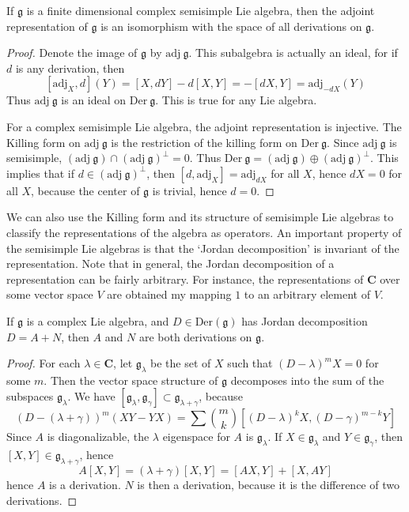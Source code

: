 \begin{theorem}
    If $\mathfrak{g}$ is a finite dimensional complex semisimple Lie algebra, then the adjoint representation of $\mathfrak{g}$ is an isomorphism with the space of all derivations on $\mathfrak{g}$.
\end{theorem}
\begin{proof}
    Denote the image of $\mathfrak{g}$ by $\text{adj}\ \mathfrak{g}$. This subalgebra is actually an ideal, for if $d$ is any derivation, then
    \[ [\text{adj}_X, d](Y) = [X,dY] - d[X,Y] = -[dX,Y] = \text{adj}_{-dX}(Y) \]
    Thus $\text{adj}\ \mathfrak{g}$ is an ideal on $\text{Der}\ \mathfrak{g}$. This is true for any Lie algebra.

    For a complex semisimple Lie algebra, the adjoint representation is injective. The Killing form on $\text{adj}\ \mathfrak{g}$ is the restriction of the killing form on $\text{Der}\ \mathfrak{g}$. Since $\text{adj}\ \mathfrak{g}$ is semisimple, $(\text{adj}\ \mathfrak{g}) \cap (\text{adj}\ \mathfrak{g})^\perp = 0$. Thus $\text{Der}\ \mathfrak{g} = (\text{adj}\ \mathfrak{g}) \oplus (\text{adj}\ \mathfrak{g})^\perp$. This implies that if $d \in (\text{adj}\ \mathfrak{g})^\perp$, then $[d,\text{adj}_X] = \text{adj}_{dX}$ for all $X$, hence $dX = 0$ for all $X$, because the center of $\mathfrak{g}$ is trivial, hence $d = 0$.
\end{proof}

We can also use the Killing form and its structure of semisimple Lie algebras to classify the representations of the algebra as operators. An important property of the semisimple Lie algebras is that the `Jordan decomposition' is invariant of the representation. Note that in general, the Jordan decomposition of a representation can be fairly arbitrary. For instance, the representations of $\mathbf{C}$ over some vector space $V$ are obtained my mapping $1$ to an arbitrary element of $V$.

\begin{theorem}
    If $\mathfrak{g}$ is a complex Lie algebra, and $D \in \text{Der}(\mathfrak{g})$ has Jordan decomposition $D = A + N$, then $A$ and $N$ are both derivations on $\mathfrak{g}$.
\end{theorem}
\begin{proof}
    For each $\lambda \in \mathbf{C}$, let $\mathfrak{g}_\lambda$ be the set of $X$ such that $(D - \lambda)^mX = 0$ for some $m$. Then the vector space structure of $\mathfrak{g}$ decomposes into the sum of the subspaces $\mathfrak{g}_\lambda$. We have $[\mathfrak{g}_\lambda, \mathfrak{g}_\gamma] \subset \mathfrak{g}_{\lambda + \gamma}$, because
    \[ (D - (\lambda + \gamma))^m(XY - YX) = \sum {m \choose k} [(D - \lambda)^k X, (D - \gamma)^{m-k} Y] \]
    Since $A$ is diagonalizable, the $\lambda$ eigenspace for $A$ is $\mathfrak{g}_\lambda$. If $X \in \mathfrak{g}_\lambda$ and $Y \in \mathfrak{g}_\gamma$, then $[X,Y] \in \mathfrak{g}_{\lambda + \gamma}$, hence
    \[ A[X,Y] = (\lambda + \gamma)[X,Y] = [AX, Y] + [X,AY] \]
    hence $A$ is a derivation. $N$ is then a derivation, because it is the difference of two derivations.
\end{proof}

